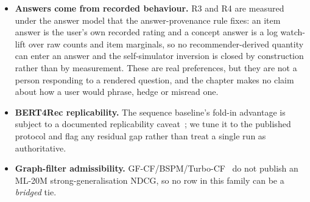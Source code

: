 \documentclass[11pt]{article}
\begin{document}
\begin{itemize}[leftmargin=1.4em,itemsep=3pt]
        however, bear asymmetrically on R4, and we are precise about which half---and about what each
        measurement varies, since the two are easily confused. \emph{Intensity} within likes is measurable on
        this protocol: holding the fold-in support \emph{identical} and varying only the star level each item
        carries is worth $+0.0039$ full (paired CI $[+0.0025,+0.0053]$) and $+0.0020$ tail
        ($[+0.0007,+0.0031]$) over $10{,}000$ users (\S\ref{sec:expdesign}). \emph{Sign} is a different
        comparison---it varies \emph{what is folded}, adding the dislikes rather than re-valuing the likes---and
        is not measurable on this protocol at all, because a fold-in filtered to
        $r>3.5$ contains no dislike to fold: the protocol does not merely leave that capability unrewarded,
        it removes the input that would exercise it. What sign is worth at the full profile is therefore an
        open quantity on this ruler, and the evidence we report for it comes from the interview curves
        (Figure~\ref{fig:gradedcurve}), which are not governed by the full-profile protocol. We note also that
        masking the disliked items out of the candidate pool would \emph{not} be a repair: it would supply
        every model with a dislike-avoidance oracle the models themselves were denied, and in doing so
        remove precisely the items a dislike-aware recommender earns its advantage by demoting.
  \item \textbf{Answers come from recorded behaviour.} R3 and R4 are measured under the answer model that
        the answer-provenance rule fixes: an item answer is the user's own recorded rating and a concept answer is a log
        watch-lift over raw counts and item marginals, so no recommender-derived quantity can enter an answer and
        the self-simulator inversion is closed by construction rather than by measurement. These are real
        preferences, but they are not a person responding to a rendered question, and the chapter makes no claim
        about how a user would phrase, hedge or misread one.
  \item \textbf{BERT4Rec replicability.} The sequence baseline's fold-in advantage is subject to a documented
        replicability caveat~\cite{petrov2022replicability}; we tune it to the published protocol and flag any
        residual gap rather than treat a single run as authoritative.
  \item \textbf{Graph-filter admissibility.} GF-CF/BSPM/Turbo-CF~\cite{shen2021gfcf,choi2023bspm,park2024turbocf} do
        not publish an ML-20M strong-generalisation NDCG, so no row in this family can be a \emph{bridged} tie.

\end{itemize}
\end{document}
